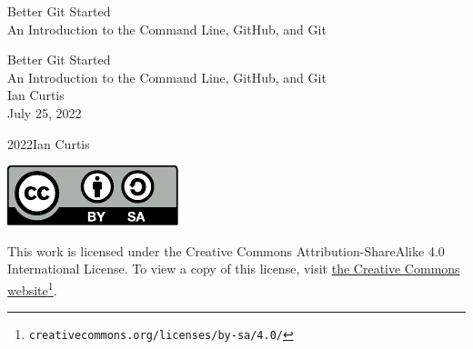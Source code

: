 \documentclass[oneside,10pt,]{book}
\newcommand{\titlepagefont}{\relax}
\begin{document}
\raggedbottom
\frontmatter
\thispagestyle{empty}
{\titlepagefont\centering
\vspace*{0.28\textheight}
{\Huge Better Git Started}\\[2\baselineskip]
{\LARGE An Introduction to the Command Line, GitHub, and Git}\\
}
\clearpage
\thispagestyle{empty}
{\titlepagefont\centering
\vspace*{0.14\textheight}
{\Huge Better Git Started}\\[\baselineskip]
{\LARGE An Introduction to the Command Line, GitHub, and Git}\\[3\baselineskip]
{\Large Ian Curtis}\\[3\baselineskip]
{\Large July 25, 2022}\\}
\clearpage
\thispagestyle{empty}
\hypertarget{g:colophon:idm481221864}{}
\noindent\textcopyright{}2022\quad{}Ian Curtis\\[0.5\baselineskip]
\begin{image}{0.4}{0.2}{0.4}%
\includegraphics[width=\linewidth]{external/cc_by_sa.pdf}
\end{image}%
 This work is licensed under the Creative Commons Attribution-ShareAlike 4.0 International License. To view a copy of this license, visit \href{http://creativecommons.org/licenses/by-sa/4.0/}{the Creative Commons website}\footnote{\nolinkurl{creativecommons.org/licenses/by-sa/4.0/}\label{g:fn:idm481222120}}.\par\medskip
{}
\null\clearpage
%
%
\typeout{************************************************}
\end{document}
